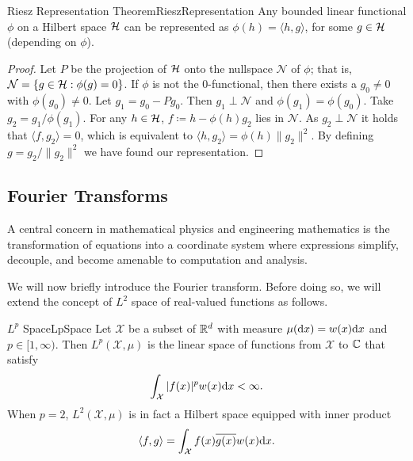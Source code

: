 \begin{thm}{Riesz Representation Theorem}{RieszRepresentation}
	Any bounded linear functional \(\phi\) on a Hilbert space \(\mathcal{H}\) can be represented as \(\phi(h) = \langle h, g \rangle\), for some \(g \in \mathcal{H}\) (depending on \(\phi\)).
\end{thm}

\begin{proof}
	Let \(P\) be the projection of \(\mathcal{H}\) onto the nullspace \(\mathcal{N}\) of \(\phi\); that is, \(\mathcal{N} = \{g \in \mathcal{H} : \phi(g) = 0\}\). If \(\phi\) is not the 0-functional, then there exists a \(g_0 \neq 0\) with \(\phi(g_0) \neq 0\). Let \(g_1 = g_0 - Pg_0\). Then \(g_1 \perp \mathcal{N}\) and \(\phi(g_1) = \phi(g_0)\). Take \(g_2 = g_1 / \phi(g_1)\). For any \(h \in \mathcal{H}\), \(f \coloneqq h - \phi(h)g_2\) lies in \(\mathcal{N}\). As \(g_2 \perp \mathcal{N}\) it holds that \(\langle f, g_2 \rangle = 0\), which is equivalent to \(\langle h, g_2 \rangle = \phi(h) \|g_2\|^2\). By defining \(g = g_2 / \|g_2\|^2\) we have found our representation.
\end{proof}

\subsection{Fourier Transforms}
A central concern in mathematical physics and engineering mathematics is the transformation of equations into a coordinate system where expressions simplify, decouple, and become amenable to computation and analysis.

We will now briefly introduce the Fourier transform. Before doing so, we will extend the concept of \(L^2\) space of real-valued functions as follows.

\begin{defn}{\(L^p\) Space}{LpSpace}
	Let \(\mathcal{X}\) be a subset of \(\mathbb{R}^d\) with measure \(\mu(\mathrm{d} x) = w(x) \mathrm{d} x\) and \(p \in [1, \infty)\). Then \(L^p(\mathcal{X}, \mu)\) is the linear space of functions from \(\mathcal{X}\) to \(\mathbb{C}\) that satisfy
	\begin{equation}
		\int_{\mathcal{X}} |f(x)|^p w(x) \mathrm{d} x < \infty. \label{eq:LpSpaceCondition}
	\end{equation}
	When \(p=2\), \(L^2(\mathcal{X}, \mu)\) is in fact a Hilbert space equipped with inner product
	\begin{equation}
		\langle f, g \rangle = \int_{\mathcal{X}} f(x) \overline{g(x)} w(x) \mathrm{d} x. \label{eq:LpInnerProduct}
	\end{equation}
\end{defn}

